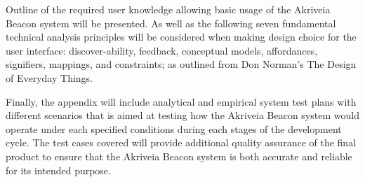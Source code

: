 \bigskip
Outline of the required user knowledge allowing basic usage of the Akriveia Beacon system will be presented. As well as the following seven fundamental technical analysis principles will be considered when making design choice for the user interface: discover-ability, feedback, conceptual models, affordances, signifiers, mappings, and constraints; as outlined from Don Norman's The Design of Everyday Things.

\bigskip
Finally, the appendix will include analytical and empirical system test plans with different scenarios that is aimed at testing how the Akriveia Beacon system would operate under each specified conditions during each stages of the development cycle. The test cases covered will provide additional quality assurance of the final product to ensure that the Akriveia Beacon system is both accurate and reliable for its intended purpose.






